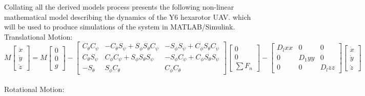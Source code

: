 \documentclass[12pt,a4paper,twoside]{report}
\begin{document}
			Collating all the derived models process presents the following non-linear mathematical model describing the dynamics of the Y6 hexarotor UAV. which will be used to produce simulations of the system in MATLAB/Simulink.
			\\
			Translational Motion:
			\\ 
			$$ 
				M 
				\begin{bmatrix}
				\ddot{x} \\
				\ddot{y} \\
				\ddot{z}
				\end{bmatrix}
				=
				M 
				\begin{bmatrix}
				0 \\
				0 \\
				g
				\end{bmatrix}
				-
				\begin{bmatrix}
				C_\theta C_\psi & -C_\theta S_\psi + S_\phi S_\theta C_\psi & -S_\phi S_\psi + C_\phi S_\theta C_\psi \\
				C_\theta S_\psi &  C_\phi C_\psi + S_\phi S_\theta S_\psi   & -S_\phi C_\psi + C_\phi S_\theta S_\psi \\
				-S_\theta       &  S_\phi C_\theta                          &  C_\phi C_\theta
				\end{bmatrix}
				\begin{bmatrix}
				0 \\
				0 \\
				\sum F_n 
				\end{bmatrix}
				-
				\begin{bmatrix}
				D_lxx & 0 & 0 \\
				0 & D_1yy & 0 \\
				0 & 0 & D_lzz
				\end{bmatrix}
				\begin{bmatrix}
				\dot{x} \\
				\dot{y} \\
				\dot{z} 
				\end{bmatrix}
			$$ 
			\\
			Rotational Motion:
			\\
\end{document}
